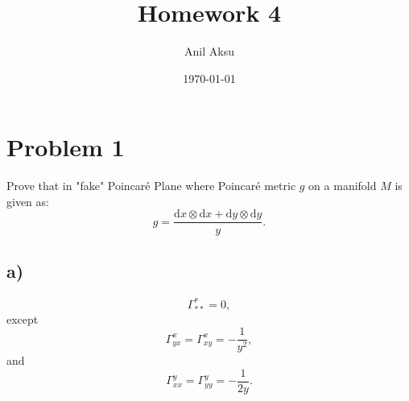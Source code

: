\documentclass[11pt]{amsart}
\title{Homework 4}
\author{Anil Aksu}
\date{\today}
\begin{document}
\maketitle

\section*{Problem 1 }

Prove that in "fake" Poincar\'{e} Plane  where Poincar\'{e} metric $g$ on a manifold $M$ is given as:
\begin{equation*}
g=\frac{\mathrm{d}x\otimes \mathrm{d}x +\mathrm{d}y\otimes \mathrm{d}y }{y}.
\end{equation*} 
\subsection*{a)}
\begin{equation*}
\Gamma_{**}^{*}=0,
\end{equation*}
except
\begin{equation*}
\Gamma_{yx}^{x}=\Gamma_{xy}^{x}=-\frac{1}{y^2},
\end{equation*}
and 
\begin{equation*}
\Gamma_{xx}^{y}=\Gamma_{yy}^{y}=-\frac{1}{2y}.
\end{equation*}
\end{document}
